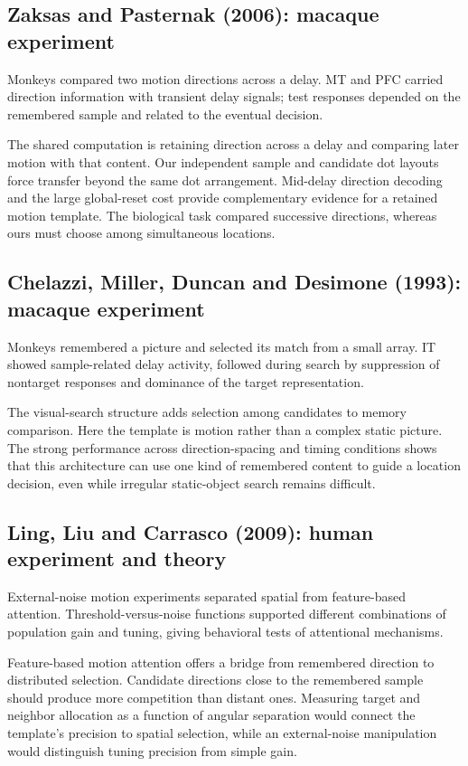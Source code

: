 \documentclass[11pt]{article}
\begin{document}
\subsection{Zaksas and Pasternak (2006): macaque experiment}
Monkeys compared two motion directions across a delay. MT and PFC carried direction information with transient delay signals; test responses depended on the remembered sample and related to the eventual decision. \cite{bio_zaksas}

The shared computation is retaining direction across a delay and comparing later motion with that content. Our independent sample and candidate dot layouts force transfer beyond the same dot arrangement. Mid-delay direction decoding and the large global-reset cost provide complementary evidence for a retained motion template. The biological task compared successive directions, whereas ours must choose among simultaneous locations.

\subsection{Chelazzi, Miller, Duncan and Desimone (1993): macaque experiment}
Monkeys remembered a picture and selected its match from a small array. IT showed sample-related delay activity, followed during search by suppression of nontarget responses and dominance of the target representation. \cite{bio_chelazzi}

The visual-search structure adds selection among candidates to memory comparison. Here the template is motion rather than a complex static picture. The strong performance across direction-spacing and timing conditions shows that this architecture can use one kind of remembered content to guide a location decision, even while irregular static-object search remains difficult.

\subsection{Ling, Liu and Carrasco (2009): human experiment and theory}
External-noise motion experiments separated spatial from feature-based attention. Threshold-versus-noise functions supported different combinations of population gain and tuning, giving behavioral tests of attentional mechanisms. \cite{bio_ling}

Feature-based motion attention offers a bridge from remembered direction to distributed selection. Candidate directions close to the remembered sample should produce more competition than distant ones. Measuring target and neighbor allocation as a function of angular separation would connect the template’s precision to spatial selection, while an external-noise manipulation would distinguish tuning precision from simple gain.
\end{document}

